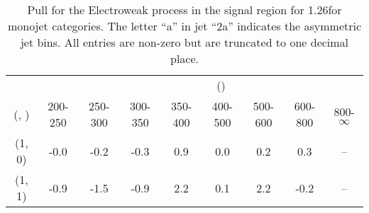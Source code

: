 \begin{table}[h!]
\tiny
\centering
\caption{Pull for the Electroweak process in the signal region for 1.26\ifb for monojet categories. The letter ``a'' in jet \eg ``2a''  indicates the asymmetric jet bins. All entries are non-zero but are truncated to one decimal place.\label{tab:pullsep_sig_ewk_mono}}
\begin{tabular}
{ccccccccc}
	\hline\hline
&	& \multicolumn{8}{c}{\scalht (\gev)} \\ 
	 (\njet,  \nb) & 200-250 & 250-300 & 300-350 & 350-400 & 400-500 & 500-600 & 600-800 & 800-$\infty$ \\ [0.8ex] 
\hline
	(1, 0) & -0.0 & -0.2 & -0.3 & 0.9 & 0.0 & 0.2 & 0.3 & -- \\[0.5ex] 
	(1, 1) & -0.9 & -1.5 & -0.9 & 2.2 & 0.1 & 2.2 & -0.2 & -- \\[0.5ex] 
	\hline
	\hline
\end{tabular}
\end{table}
